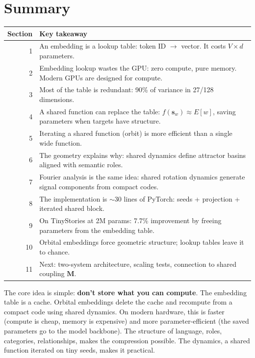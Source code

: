 \documentclass[11pt, a4paper]{article}
\newcommand{\M}{\mathbf{M}}
\newcommand{\s}{\mathbf{s}}
\theoremstyle{remark}
\begin{document}
\section*{Summary}

\begin{center}\small
\begin{tabular}{@{}rp{10cm}@{}}
\toprule
\textbf{Section} & \textbf{Key takeaway} \\
\midrule
1 & An embedding is a lookup table: token ID $\to$ vector. It costs $V \times d$ parameters. \\
2 & Embedding lookup wastes the GPU: zero compute, pure memory. Modern GPUs are designed for compute. \\
3 & Most of the table is redundant: 90\% of variance in 27/128 dimensions. \\
4 & A shared function can replace the table: $f(\s_w) \approx E[w]$, saving parameters when targets have structure. \\
5 & Iterating a shared function (orbit) is more efficient than a single wide function. \\
6 & The geometry explains why: shared dynamics define attractor basins aligned with semantic roles. \\
7 & Fourier analysis is the same idea: shared rotation dynamics generate signal components from compact codes. \\
8 & The implementation is $\sim$30 lines of PyTorch: seeds + projection + iterated shared block. \\
9 & On TinyStories at 2M params: 7.7\% improvement by freeing parameters from the embedding table. \\
10 & Orbital embeddings force geometric structure; lookup tables leave it to chance. \\
11 & Next: two-system architecture, scaling tests, connection to shared coupling $\M$. \\
\bottomrule
\end{tabular}
\end{center}

The core idea is simple: \textbf{don't store what you can compute}.
The embedding table is a cache.
Orbital embeddings delete the cache and recompute from a compact code using shared dynamics.
On modern hardware, this is faster (compute is cheap, memory is expensive) and more parameter-efficient (the saved parameters go to the model backbone).
The structure of language, roles, categories, relationships, makes the compression possible.
The dynamics, a shared function iterated on tiny seeds, makes it practical.
\end{document}
